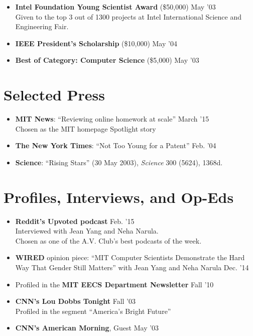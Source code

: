 \documentclass[margin]{res}
\begin{document}
\begin{resume}
\begin{itemize}[leftmargin=*]
\begin{itemize}[leftmargin=*]
\item {\bf Intel Foundation Young Scientist Award} (\$50,000) \hfill May '03 \\Given to the top 3 out of 1300 projects at Intel International Science and Engineering Fair.
\item {\bf IEEE President's Scholarship} (\$10,000) \hfill May '04
\item {\bf Best of Category: Computer Science} (\$5,000) \hfill May '03
\end{itemize}
\end{itemize}

\section{Selected Press}
\begin{itemize}[leftmargin=*] \itemsep -2pt
\item \textbf{MIT News}: ``Reviewing online homework at scale'' \hfill March '15 \\
Chosen as the MIT homepage Spotlight story 
\item \textbf{The New York Times}: ``Not Too Young for a Patent'' \hfill Feb. '04
\item \textbf{Science}: ``Rising Stars'' (30 May 2003), \textit{Science} 300 (5624), 1368d.

\end{itemize}

\section{Profiles, Interviews, and Op-Eds}
\begin{itemize}[leftmargin=*] \itemsep -2pt 
\item {\bf Reddit's Upvoted podcast} \hfill Feb. '15 \\ Interviewed with Jean Yang and Neha Narula.\\
Chosen as one of the A.V. Club's best podcasts of the week.
\item {\bf WIRED} opinion piece: ``MIT Computer Scientists Demonstrate the Hard Way That Gender Still Matters'' with Jean Yang and Neha Narula \hfill Dec. '14
\item Profiled in the {\bf MIT EECS Department Newsletter} \hfill Fall '10
\item \textbf{CNN's Lou Dobbs Tonight}  \hfill Fall '03 \\ Profiled in the segment ``America's Bright Future''
\item \textbf{CNN's American Morning}, Guest \hfill May '03
\end{itemize}


\end{resume}
\end{document}

